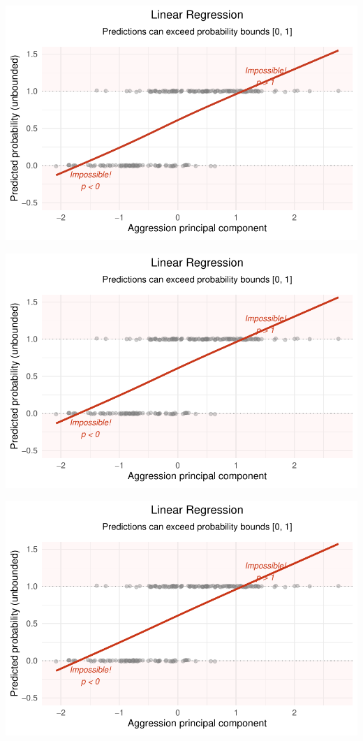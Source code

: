 \documentclass[
  letterpaper,
  DIV=11,
  numbers=noendperiod]{scrartcl}
\begin{document}
\begin{center}
\includegraphics[width=0.8\linewidth,height=\textheight,keepaspectratio]{Beyond!!!_files/figure-pdf/unnamed-chunk-4-93.pdf}
\end{center}

\begin{center}
\includegraphics[width=0.8\linewidth,height=\textheight,keepaspectratio]{Beyond!!!_files/figure-pdf/unnamed-chunk-4-94.pdf}
\end{center}

\begin{center}
\includegraphics[width=0.8\linewidth,height=\textheight,keepaspectratio]{Beyond!!!_files/figure-pdf/unnamed-chunk-4-95.pdf}
\end{center}
\end{document}
